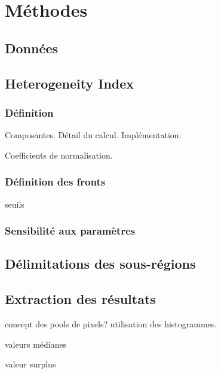
\chapter{Méthodes}

\section{Données}

\section{Heterogeneity Index}
\subsection{Définition}

Composantes.
Détail du calcul.
Implémentation.

Coefficients de normalisation.

\subsection{Définition des fronts}

seuils

\subsection{Sensibilité aux paramètres}



\section{Délimitations des sous-régions}


\section{Extraction des résultats}

concept des pools de pixels?
utilisation des histogrammes.

valeurs médianes

valeur surplus
